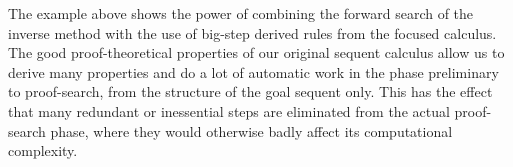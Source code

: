 
The example above shows the power of combining the forward search of the inverse
method with the use of big-step derived rules from the focused calculus.  The
good proof-theoretical properties of our original sequent calculus allow us to
derive many properties and do a lot of automatic work in the phase preliminary
to proof-search, from the structure of the goal sequent only. This has the
effect that many redundant or inessential steps are eliminated from the actual
proof-search phase, where they would otherwise badly affect its computational
complexity.

